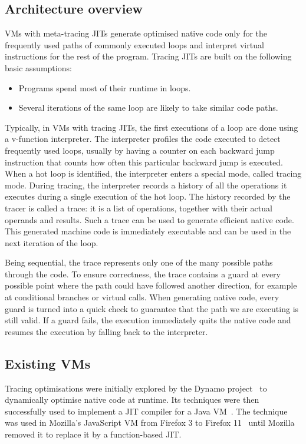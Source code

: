 \documentclass[a4paper,12pt,twoside]{../includes/ThesisStyle}
\begin{document}
\subsection{Architecture overview}

VMs with meta-tracing JITs generate optimised native code only for the frequently used paths of commonly executed loops and interpret virtual instructions for the rest of the program. Tracing JITs are built on the following basic assumptions:
\begin{itemize}
	\item Programs spend most of their runtime in loops.
	\item Several iterations of the same loop are likely to take similar code paths.
\end{itemize}

Typically, in VMs with tracing JITs, the first executions of a loop are done using a v-function interpreter. The interpreter profiles the code executed to detect frequently used loops, usually by having a counter on each backward jump instruction that counts how often this particular backward jump is executed. When a hot loop is identified, the interpreter enters a special mode, called tracing mode. During tracing, the interpreter records a history of all the operations it executes during a single execution of the hot loop. The history recorded by the tracer is called a trace: it is a list of operations, together with their actual operands and results. Such a trace can be used to generate efficient native code. This generated machine code is immediately executable and can be used in the next iteration of the loop.

Being sequential, the trace represents only one of the many possible paths through the code. To ensure correctness, the trace contains a guard at every possible point where the path could have followed another direction, for example at conditional branches or virtual calls. When generating native code, every guard is turned into a quick check to guarantee that the path we are executing is still valid. If a guard fails, the execution immediately quits the native code and resumes the execution by falling back to the interpreter.

\subsection{Existing VMs}
\label{sec:existing2}

Tracing optimisations were initially explored by the Dynamo project~\cite{Bala00a} to dynamically optimise native code at runtime. Its techniques were then successfully used to implement a JIT compiler for a Java VM~\cite{Gal06a}. The technique was used in Mozilla's JavaScript VM from Firefox 3 to Firefox 11~\cite{Gal09a} until Mozilla removed it to replace it by a function-based JIT. 
\end{document}
